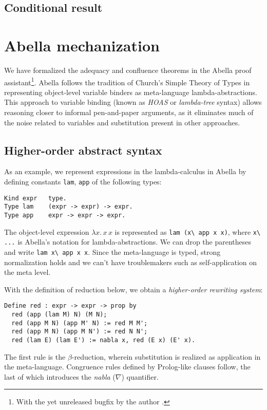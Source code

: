 \documentclass[a4paper, 11pt,titlepage, openright, twoside]{report}
\newcommand{\+}{\enspace}
\begin{document}
\section{Conditional result}


\chapter{Abella mechanization}

We have formalized the adequacy and confluence theorems in the Abella proof assistant\footnote{
	With the yet unreleased bugfix by the author \cite{abellafix}.
}.
Abella follows the tradition of Church's Simple Theory of Types
in representing object-level variable binders as meta-language lambda-abstractions.
This approach to variable binding (known as \textit{HOAS} or \textit{lambda-tree} syntax)
allows reasoning closer to informal pen-and-paper arguments, as it eliminates
much of the noise related to variables and substitution present in other approaches.

\section{Higher-order abstract syntax}

As an example, we represent expressions in the lambda-calculus in Abella by defining constants \lstinline{lam}, \lstinline{app} of the following types:
\begin{lstlisting}
Kind expr   type.
Type lam    (expr -> expr) -> expr.
Type app    expr -> expr -> expr.
\end{lstlisting}
The object-level expression $λx.\,x\,x$ is represented as \lstinline{lam (x\ app x x)},
where \lstinline{x\ ...} is Abella's notation for lambda-abstractions.
We can drop the parentheses and write \lstinline{lam x\ app x x}.
Since the meta-language is typed, strong normalization holds and we can't have troublemakers such
as self-application on the meta level.

With the definition of reduction below, we obtain a \textit{higher-order rewriting system}:
\begin{lstlisting}
Define red : expr -> expr -> prop by
  red (app (lam M) N) (M N);
  red (app M N) (app M' N) := red M M';
  red (app M N) (app M N') := red N N';
  red (lam E) (lam E') := nabla x, red (E x) (E' x).
\end{lstlisting}
The first rule is the $β$-reduction, wherein substitution is realized as application in the meta-language.
Congruence rules defined by Prolog-like clauses follow,
the last of which introduces the \textit{nabla} ($\nabla$) quantifier.
\end{document}
